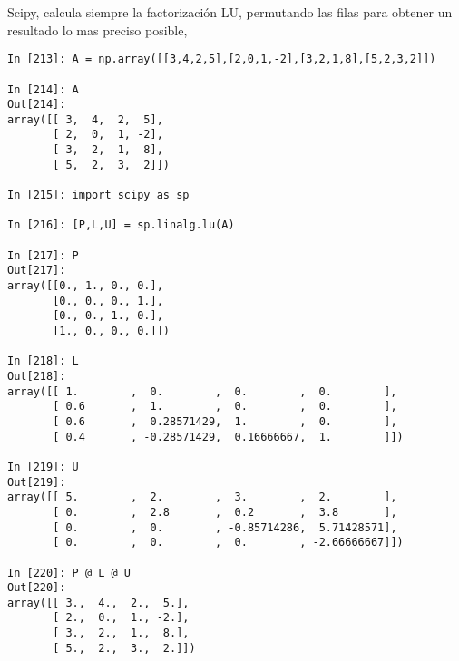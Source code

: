 
\begin{paracol}{2}
 Scipy, calcula siempre la factorización LU, permutando las filas para obtener un resultado lo mas preciso posible,
\end{paracol}
\begin{center}
\begin{minipage}{0.7\textwidth}
\begin{verbatim}
In [213]: A = np.array([[3,4,2,5],[2,0,1,-2],[3,2,1,8],[5,2,3,2]])

In [214]: A
Out[214]: 
array([[ 3,  4,  2,  5],
       [ 2,  0,  1, -2],
       [ 3,  2,  1,  8],
       [ 5,  2,  3,  2]])

In [215]: import scipy as sp

In [216]: [P,L,U] = sp.linalg.lu(A)

In [217]: P
Out[217]: 
array([[0., 1., 0., 0.],
       [0., 0., 0., 1.],
       [0., 0., 1., 0.],
       [1., 0., 0., 0.]])

In [218]: L
Out[218]: 
array([[ 1.        ,  0.        ,  0.        ,  0.        ],
       [ 0.6       ,  1.        ,  0.        ,  0.        ],
       [ 0.6       ,  0.28571429,  1.        ,  0.        ],
       [ 0.4       , -0.28571429,  0.16666667,  1.        ]])

In [219]: U
Out[219]: 
array([[ 5.        ,  2.        ,  3.        ,  2.        ],
       [ 0.        ,  2.8       ,  0.2       ,  3.8       ],
       [ 0.        ,  0.        , -0.85714286,  5.71428571],
       [ 0.        ,  0.        ,  0.        , -2.66666667]])

In [220]: P @ L @ U
Out[220]: 
array([[ 3.,  4.,  2.,  5.],
       [ 2.,  0.,  1., -2.],
       [ 3.,  2.,  1.,  8.],
       [ 5.,  2.,  3.,  2.]])
\end{verbatim}
\end{minipage}
\end{center}

